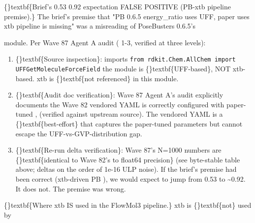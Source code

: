 \documentclass{article}
\begin{document}
\begin{table}[ht]
\centering
\small
{}%
\end{table}

\{\}textbf\{Brief's  0.53  0.92 expectation  FALSE POSITIVE (PB-xtb pipeline premise).\} The brief's premise that "PB 0.6.5 energy\_ratio uses UFF, paper uses xtb  pipeline is missing" was a misreading of PoseBusters 0.6.5's

 module. Per Wave 87 Agent A audit ( 1-3, verified at three levels):

\begin{enumerate}
\item \sloppy \{\}textbf\{Source inspection\}:  imports \texttt{from rdkit.Chem.AllChem import UFFGetMoleculeForceField}  the module is \{\}textbf\{UFF-based\}, NOT xtb-based. xtb is \{\}textbf\{not referenced\} in this module.
\item \{\}textbf\{Audit doc verification\}: Wave 87 Agent A's audit explicitly documents the Wave 82 vendored YAML is correctly configured with paper-tuned ,  (verified against  upstream source). The vendored YAML is a \{\}textbf\{best-effort\} that captures the paper-tuned parameters but cannot escape the UFF-vs-GVP-distribution gap.
\item \{\}textbf\{Re-run delta verification\}: Wave 87's N=1000 numbers are \{\}textbf\{identical to Wave 82's to float64 precision\} (see byte-stable table above; deltas on the order of 1e-16 ULP noise). If the brief's premise had been correct (xtb-driven PB ), we would expect  to jump from 0.53 to \textasciitilde{}0.92. It does not. The premise was wrong.
\end{enumerate}
\{\}textbf\{Where xtb IS used in the FlowMol3 pipeline.\} xtb is \{\}textbf\{not\} used by
\end{document}
